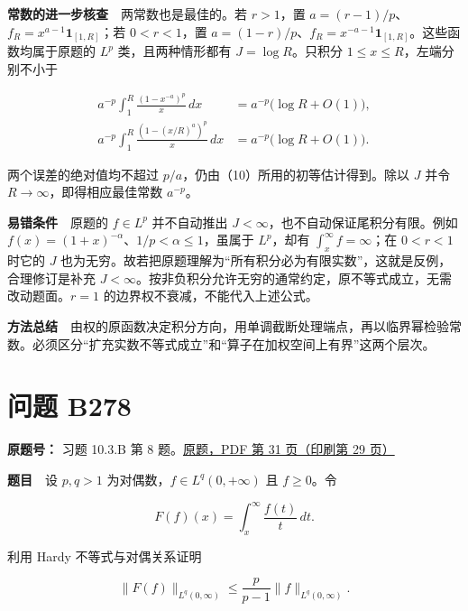 \documentclass[11pt,a4paper]{article}
\begin{document}
\textbf{常数的进一步核查}　两常数也是最佳的。若 \(r>1\)，置
\(a=(r-1)/p\)、\(f_R=x^{a-1}\mathbf1_{[1,R]}\)；若 \(0<r<1\)，置
\(a=(1-r)/p\)、\(f_R=x^{-a-1}\mathbf1_{[1,R]}\)。这些函数均属于原题的
\(L^p\) 类，且两种情形都有 \(J=\log R\)。只积分
\(1\le x\le R\)，左端分别不小于

\begin{equation}
\begin{aligned}
a^{-p}\int_1^R\frac{(1-x^{-a})^p}{x}\,dx
&=a^{-p}\bigl(\log R+O(1)\bigr),\\
a^{-p}\int_1^R\frac{(1-(x/R)^a)^p}{x}\,dx
&=a^{-p}\bigl(\log R+O(1)\bigr).
\end{aligned}
\tag{17}
\end{equation}

两个误差的绝对值均不超过 \(p/a\)，仍由（10）所用的初等估计得到。除以
\(J\) 并令 \(R\to\infty\)，即得相应最佳常数 \(a^{-p}\)。

\textbf{易错条件}　原题的 \(f\in L^p\) 并不自动推出
\(J<\infty\)，也不自动保证尾积分有限。例如
\(f(x)=(1+x)^{-\alpha}\)、\(1/p<\alpha\le1\)，虽属于 \(L^p\)，却有
\(\int_x^\infty f=\infty\)；在 \(0<r<1\) 时它的 \(J\)
也为无穷。故若把原题理解为``所有积分必为有限实数''，这就是反例，合理修订是补充
\(J<\infty\)。按非负积分允许无穷的通常约定，原不等式成立，无需改动题面。\(r=1\)
的边界权不衰减，不能代入上述公式。

\textbf{方法总结}　由权的原函数决定积分方向，用单调截断处理端点，再以临界幂检验常数。必须区分``扩充实数不等式成立''和``算子在加权空间上有界''这两个层次。

\section{问题 B278}\label{ux95eeux9898-b278}

\textbf{原题号：} 习题 10.3.B 第 8
题。\href{https://zj139.github.io/math-notes/files/problems/楼分析习题-v2.pdf\#page=31}{原题，PDF
第 31 页（印刷第 29 页）}

\textbf{题目}　设 \(p,q>1\) 为对偶数，\(f\in L^q(0,+\infty)\) 且
\(f\ge0\)。令

\begin{equation}
F(f)(x)=\int_x^\infty\frac{f(t)}t\,dt.
\tag{18}
\end{equation}

利用 Hardy 不等式与对偶关系证明

\begin{equation}
\|F(f)\|_{L^q(0,\infty)}
\le\frac p{p-1}\|f\|_{L^q(0,\infty)}.
\tag{19}
\end{equation}
\end{document}
